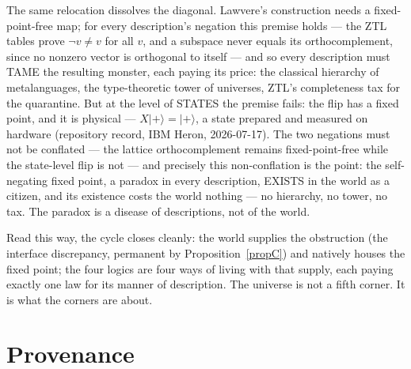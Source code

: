 \documentclass[11pt]{article}
\theoremstyle{remark}
\begin{document}
The same relocation dissolves the diagonal. Lawvere's construction needs a
fixed-point-free map; for every description's negation this premise holds
--- the ZTL tables prove $\neg v \neq v$ for all $v$, and a subspace never
equals its orthocomplement, since no nonzero vector is orthogonal to itself
--- and so every description must TAME the resulting monster, each paying
its price: the classical hierarchy of metalanguages, the type-theoretic
tower of universes, ZTL's completeness tax for the quarantine. But at the
level of STATES the premise fails: the flip has a fixed point, and it is
physical --- $X\lvert{+}\rangle = \lvert{+}\rangle$, a state prepared and
measured on hardware (repository record, IBM Heron, 2026-07-17). The two
negations must not be conflated --- the lattice orthocomplement remains
fixed-point-free while the state-level flip is not --- and precisely this
non-conflation is the point: the self-negating fixed point, a paradox in
every description, EXISTS in the world as a citizen, and its existence costs
the world nothing --- no hierarchy, no tower, no tax. The paradox is a
disease of descriptions, not of the world.

Read this way, the cycle closes cleanly: the world supplies the obstruction
(the interface discrepancy, permanent by Proposition~\ref{propC}) and
natively houses the fixed point; the four logics are four ways of living
with that supply, each paying exactly one law for its manner of description.
The universe is not a fifth corner. It is what the corners are about.

\section{Provenance}\label{sec:prov}
\end{document}
